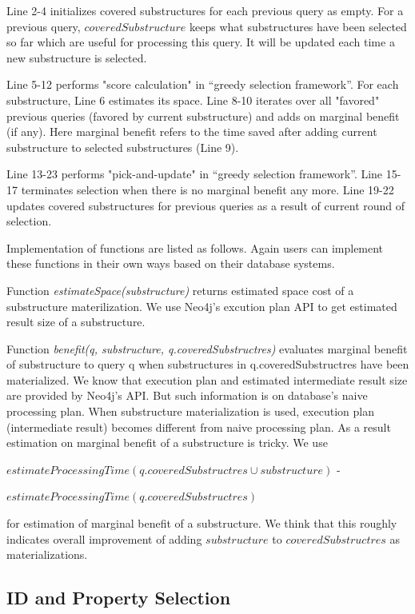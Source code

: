 Line 2-4 initializes covered substructures for each previous query as empty. For a previous query, $coveredSubstructure$ keeps what substructures have been selected so far which are useful for processing this query. It will be updated each time a new substructure is selected.

Line 5-12 performs "score calculation" in ``greedy selection framework''. For each substructure, Line 6 estimates its space. Line 8-10 iterates over all "favored" previous queries (favored by current substructure) and adds on marginal benefit (if any). Here marginal benefit refers to the time saved after adding current substructure to selected  substructures (Line 9).   

Line 13-23 performs "pick-and-update" in ``greedy selection framework''. Line 15-17 terminates selection when there is no marginal benefit any more. Line 19-22 updates covered substructures for previous queries as a result of current round of selection.

Implementation of functions are listed as follows. Again users can implement these functions in their own ways based on their database systems. 
	
Function \textit{estimateSpace(substructure)} returns estimated space cost of a substructure materilization. We use Neo4j's excution plan API to get estimated result size of a substructure.

 Function \textit{benefit(q, substructure, q.coveredSubstructres)} evaluates marginal benefit of substructure to query q when substructures in q.coveredSubstructres have been materialized. We know that execution plan and estimated intermediate result size are provided by Neo4j's API. But such information is on database's naive processing plan. When substructure materialization is used, execution plan (intermediate result) becomes different from naive processing plan. As a result estimation on marginal benefit of a substructure is tricky. We use 
 
 $estimateProcessingTime(q.coveredSubstructres \cup substructure)$ 
 - 
 
 $estimateProcessingTime(q.coveredSubstructres)$
 
 for estimation of marginal benefit of a substructure. We think that this roughly indicates overall improvement of adding $substructure$ to $coveredSubstructres$ as materializations.
 


\subsection{ID and Property Selection}

